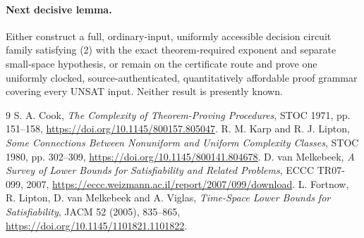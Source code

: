 \documentclass[11pt]{article}
\begin{document}
\paragraph{Next decisive lemma.}
Either construct a full, ordinary-input, uniformly accessible decision
circuit family satisfying (2) with the exact theorem-required exponent and
separate small-space hypothesis, or remain on the certificate route and
prove one uniformly clocked, source-authenticated, quantitatively affordable
proof grammar covering every UNSAT input.  Neither result is presently
known.

\begin{thebibliography}{9}
 S. A. Cook, \emph{The Complexity of Theorem-Proving
Procedures}, STOC 1971, pp. 151--158,
\url{https://doi.org/10.1145/800157.805047}.
 R. M. Karp and R. J. Lipton, \emph{Some Connections
Between Nonuniform and Uniform Complexity Classes}, STOC 1980, pp. 302--309,
\url{https://doi.org/10.1145/800141.804678}.
 D. van Melkebeek, \emph{A Survey of Lower Bounds for
Satisfiability and Related Problems}, ECCC TR07-099, 2007,
\url{https://eccc.weizmann.ac.il/report/2007/099/download}.
 L. Fortnow, R. Lipton, D. van Melkebeek and A. Viglas,
\emph{Time-Space Lower Bounds for Satisfiability}, JACM 52 (2005), 835--865,
\url{https://doi.org/10.1145/1101821.1101822}.
\end{thebibliography}
\end{document}
